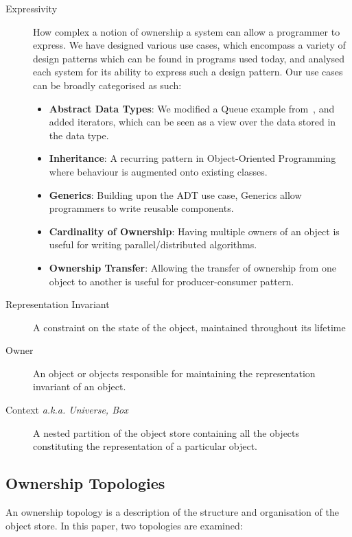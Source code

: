 \documentclass{acm_proc_article-sp}
\begin{document}
\begin{description}
	\item[Expressivity] How complex a notion of ownership a system can allow a 
	programmer to express. We have designed various use cases, which encompass 
	a variety of design patterns which can be found in programs used today, and 
	analysed each system for its ability to express such a design pattern. Our 
	use cases can be broadly categorised as such:
	
	\begin{itemize}
		\item \textbf{Abstract Data Types}: We modified a Queue example
		from~\cite{boyapati04safejava}, and added iterators, which can be seen
		as a view over the data stored in the data type.
		\item \textbf{Inheritance}: A recurring pattern in Object-Ori\-ented 	
		Programming where behaviour is augme\-nted onto existing classes.
		\item \textbf{Generics}: Building upon the ADT use case, Gen\-erics 
		allow programmers to write reusable components.
		\item \textbf{Cardinality of Ownership}: Having multiple owners of an 
		object is useful for writing parallel/distributed algorithms.
		\item \textbf{Ownership Transfer}: Allowing the transfer of ownership 
		from 
		one object to another is useful for producer-consumer pattern.
		
	\end{itemize}
	
	\item[Representation Invariant] A constraint on the state of the object, 
	maintained throughout its lifetime
	\item[Owner] An object or objects responsible for maintaining  the 
	representation invariant of an object.
	\item[Context \emph{a.k.a. Universe, Box}] A nested partition of the object 
	store containing all the objects constituting the representation of 
	a particular object.

\end{description}

\subsection{Ownership Topologies}
\label{subsec:topologies}

An ownership topology is a description of the structure and organisation of the 
object store. In this paper, two topologies are examined:
\end{document}
